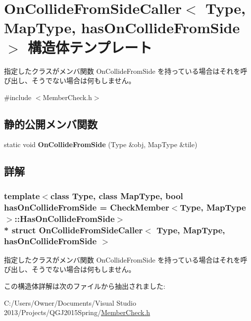 \hypertarget{struct_on_collide_from_side_caller}{}\section{On\+Collide\+From\+Side\+Caller$<$ Type, Map\+Type, has\+On\+Collide\+From\+Side $>$ 構造体テンプレート}
\label{struct_on_collide_from_side_caller}


指定したクラスがメンバ関数 On\+Collide\+From\+Side を持っている場合はそれを呼び出し、そうでない場合は何もしません。 




{\ttfamily \#include $<$Member\+Check.\+h$>$}

\subsection*{静的公開メンバ関数}
\begin{DoxyCompactItemize}
\item 
static void {\bfseries On\+Collide\+From\+Side} (Type \&obj, Map\+Type \&tile)\hypertarget{struct_on_collide_from_side_caller_a64c7e1710bfc0406e7dd9a5125398df6}{}\label{struct_on_collide_from_side_caller_a64c7e1710bfc0406e7dd9a5125398df6}

\end{DoxyCompactItemize}


\subsection{詳解}
\subsubsection*{template$<$class Type, class Map\+Type, bool has\+On\+Collide\+From\+Side = Check\+Member$<$\+Type, Map\+Type$>$\+::\+Has\+On\+Collide\+From\+Side$>$\\*
struct On\+Collide\+From\+Side\+Caller$<$ Type, Map\+Type, has\+On\+Collide\+From\+Side $>$}

指定したクラスがメンバ関数 On\+Collide\+From\+Side を持っている場合はそれを呼び出し、そうでない場合は何もしません。



この構造体詳解は次のファイルから抽出されました\+:\begin{DoxyCompactItemize}
\item 
C\+:/\+Users/\+Owner/\+Documents/\+Visual Studio 2013/\+Projects/\+Q\+G\+J2015\+Spring/\hyperlink{_member_check_8h}{Member\+Check.\+h}\end{DoxyCompactItemize}

